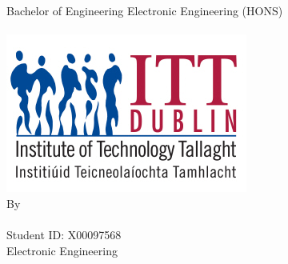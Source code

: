 \begin{center}
	\makeatletter
	{\huge Bachelor of Engineering Electronic Engineering (HONS)}\\[2cm] 
	{\Huge \textbf{\@title}}\\[3cm] 
	\includegraphics [scale =2]{../Photo/itt-logo} \\[2cm]   
	{\Huge By} \\[1cm] 
	{\LARGE \@author}\\[1cm] 
	{\large Student ID: X00097568}\\[1cm]  
	{\LARGE Electronic Engineering}\\[2cm] 
\end{center}



 
